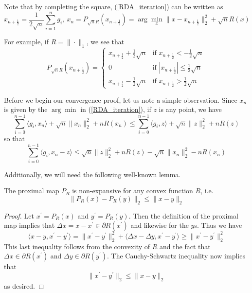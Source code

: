 Note that by completing the square, (\ref{RDA_iteration}) can be written as
\begin{equation}
    x_{n+\frac{1}{2}} = \frac{1}{2\sqrt{n}}\displaystyle\sum_{i=1}^n g_i,~x_n = P_{\sqrt{n}R}(x_{n+\frac{1}{2}}) = \arg\min_x \|x - x_{n+\frac{1}{2}}\|_2^2 + \sqrt{n}R(x)
\end{equation}

For example, if $R = \|\cdot\|_1$, we see that
\begin{equation}
    P_{\sqrt{n}R}(x_{n+\frac{1}{2}}) = 
    \begin{cases}
     x_{n+\frac{1}{2}} + \frac{1}{2}\sqrt{n} & \text{if $x_{n+\frac{1}{2}} < -\frac{1}{2}\sqrt{n}$} \\
     0 & \text{if $|x_{n+\frac{1}{2}}| \leq \frac{1}{2}\sqrt{n}$} \\
     x_{n+\frac{1}{2}} - \frac{1}{2}\sqrt{n} & \text{if $x_{n+\frac{1}{2}} > \frac{1}{2}\sqrt{n}$}
    \end{cases}
\end{equation}

Before we begin our convergence proof, let us note a simple observation. Since $x_n$ is given by the $\arg\min$ in (\ref{RDA_iteration}), if
$z$ is any point, we have
\begin{equation}
    \displaystyle\sum_{i = 0}^{n-1} \langle g_i, x_n\rangle + \sqrt{n}\|x_n\|_2^2 + nR(x_n)\leq \displaystyle\sum_{i = 0}^{n-1} \langle g_i, z\rangle + \sqrt{n}\|z\|_2^2 + nR(z)
\end{equation}
so that
\begin{equation}\label{minimum_property}
    \displaystyle\sum_{i = 0}^{n-1} \langle g_i, x_n - z\rangle \leq \sqrt{n}\|z\|_2^2 + nR(z) - \sqrt{n}\|x_n\|_2^2 - nR(x_n)
\end{equation}


Additionally, we will need the following well-known lemma.
\begin{lemma}\label{non-expansive}
 The proximal map $P_R$ is non-expansive for any convex function $R$, i.e.
 \begin{equation}
     \|P_R(x) - P_R(y)\|_2 \leq \|x - y\|_2
 \end{equation}
\end{lemma}
\begin{proof}
 Let $x^\prime = P_R(x)$ and $y^\prime = P_R(y)$. Then the definition of the proximal map implies that $\Delta x = x - x^\prime\in \partial R(x^\prime)$ and likewise for the $y$s. Thus we have
 \begin{equation}
     \langle x - y, x^\prime - y^\prime\rangle = \|x^\prime - y^\prime\|_2^2 + \langle\Delta x - \Delta y, x^\prime - y^\prime\rangle \geq \|x^\prime - y^\prime\|_2^2
 \end{equation}
 This last inequality follows from the convexity of $R$ and the fact that $\Delta x \in \partial R(x^\prime)$ and $\Delta y \in \partial R(y^\prime)$. The Cauchy-Schwartz inequality
 now implies that
 \begin{equation}
     \|x^\prime - y^\prime\|_2 \leq \|x - y\|_2
 \end{equation}
 as desired.
\end{proof}


